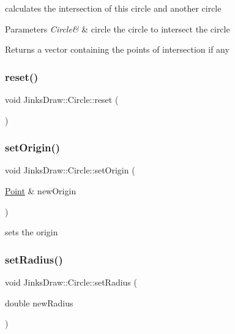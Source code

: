calculates the intersection of this circle and another circle 


\begin{DoxyParams}{Parameters}
{\em Circle\&} & circle the circle to intersect the circle \\
\hline
\end{DoxyParams}
\begin{DoxyReturn}{Returns}
a vector containing the points of intersection if any 
\end{DoxyReturn}
\mbox{\label{class_jinks_draw_1_1_circle_aeac44e44f82737c37dfad7f8142e5754}} 
\subsubsection{\texorpdfstring{reset()}{reset()}}
{\footnotesize\ttfamily void Jinks\+Draw\+::\+Circle\+::reset (\begin{DoxyParamCaption}{ }\end{DoxyParamCaption})}

\mbox{\label{class_jinks_draw_1_1_circle_a672cdc8d12a4f9667572bf069ec7988c}} 
\subsubsection{\texorpdfstring{set\+Origin()}{setOrigin()}}
{\footnotesize\ttfamily void Jinks\+Draw\+::\+Circle\+::set\+Origin (\begin{DoxyParamCaption}\item[{\mbox{\hyperlink{class_jinks_draw_1_1_point}{Point}} \&}]{new\+Origin }\end{DoxyParamCaption})}



sets the origin 

\mbox{\label{class_jinks_draw_1_1_circle_ae22a9e43bd368b4ed2fe4898e2439466}} 
\subsubsection{\texorpdfstring{set\+Radius()}{setRadius()}}
{\footnotesize\ttfamily void Jinks\+Draw\+::\+Circle\+::set\+Radius (\begin{DoxyParamCaption}\item[{double}]{new\+Radius }\end{DoxyParamCaption})}



